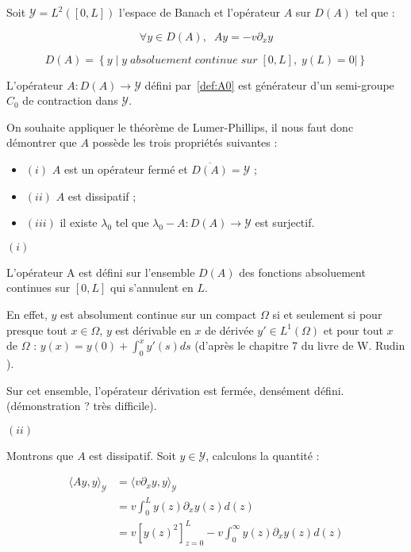 \documentclass[a4paper]{article}
\begin{document}
Soit $\mathscr{Y} = L^2([0,L])$ l'espace de Banach et l'opérateur $A$ sur $D(A)$ tel que :

\begin{equation} 
	\label{def:A0}
	\forall y \in D(A), \; \; Ay = -v \partial_x y
\end{equation}

\[ D(A)=\left\{y \; | \; y \; absoluement \; continue \; sur \; [0,L],\; y(L) =0| \right\}\]


\begin{proposition}
	\label{prop:cas0}
	L'opérateur $A: D(A) \to \mathscr{Y}$ défini par~\eqref{def:A0}
	est générateur d'un semi-groupe $C_0$ de contraction dans $\mathscr{Y}$.
\end{proposition}

\begin{preuve}
	On souhaite appliquer le théorème de Lumer-Phillips, 
	il nous faut donc démontrer que $A$ possède les trois propriétés suivantes :
\begin{itemize}
	\item $(i)$ $A$ est un opérateur fermé et $\overline{D(A)} = \mathscr{Y}$ ;
	\item $(ii)$ $A$ est dissipatif ;
	\item $(iii)$ il existe $\lambda_0$ tel que $\lambda_0 - A : D(A) \to \mathscr{Y}$ est surjectif.
\end{itemize}

\vspace{0.3cm}
$(i)$

L'opérateur A est défini sur l'ensemble $D(A)$ des fonctions absoluement continues sur $[0,L]$ qui s'annulent en $L$. 

En effet, $y$ est absolument continue sur un compact $\Omega$ si et seulement si pour presque tout $x \in \Omega$, $y$ est dérivable en $x$ de dérivée $y'\in L^1(\Omega)$ et
pour tout $x$ de $\Omega$ : $y(x)=y(0)+\int_0^x y'(s)ds$ 
(d'après le chapitre 7 du livre de W. Rudin \cite{WRudin}).

Sur cet ensemble, l'opérateur dérivation est fermée, densément défini.
(démonstration ? très difficile).

\vspace{0.3cm}
$(ii)$

Montrons que $A$ est dissipatif.
Soit $y \in \mathscr{Y}$, 
calculons la quantité :

\[ \begin{split}
\langle Ay,y \rangle_{\mathscr{Y}} &= \langle v \partial_x y, y \rangle_{\mathscr{Y}}  \\
                     &= v \int_0^L y(z) \partial_x y(z) d(z) \\
					 & = v[y(z)^2]_{z=0}^L - v \int_0^\infty y(z) \partial_x y(z) d(z)
\end{split} \]


\end{preuve}
\end{document}
